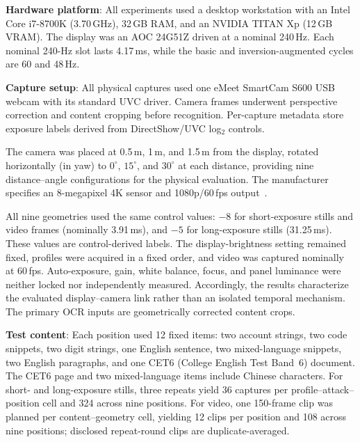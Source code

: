 \documentclass{ieeeaccess}
\begin{document}
\textbf{Hardware platform}: All experiments used a desktop workstation with an Intel Core i7-8700K (3.70\,GHz), 32\,GB RAM, and an NVIDIA TITAN Xp (12\,GB VRAM). The display was an AOC 24G51Z driven at a nominal 240\,Hz. Each nominal 240-Hz slot lasts 4.17\,ms, while the basic and inversion-augmented cycles are 60 and 48\,Hz.

\textbf{Capture setup}: All physical captures used one eMeet SmartCam S600 USB webcam with its standard UVC driver. Camera frames underwent perspective correction and content cropping before recognition. Per-capture metadata store exposure labels derived from DirectShow/UVC log$_2$ controls.

The camera was placed at 0.5\,m, 1\,m, and 1.5\,m from the display, rotated horizontally (in yaw) to $0^{\circ}$, $15^{\circ}$, and $30^{\circ}$ at each distance, providing nine distance--angle configurations for the physical evaluation. The manufacturer specifies an 8-megapixel 4K sensor and 1080p/60\,fps output~\cite{b_emeet_s600}.

All nine geometries used the same control values: $-8$ for short-exposure stills and video frames (nominally 3.91\,ms), and $-5$ for long-exposure stills (31.25\,ms). These values are control-derived labels. The display-brightness setting remained fixed, profiles were acquired in a fixed order, and video was captured nominally at 60\,fps. Auto-exposure, gain, white balance, focus, and panel luminance were neither locked nor independently measured. Accordingly, the results characterize the evaluated display--camera link rather than an isolated temporal mechanism. The primary OCR inputs are geometrically corrected content crops.



\textbf{Test content}: Each position used 12 fixed items: two account strings, two code snippets, two digit strings, one English sentence, two mixed-language snippets, two English paragraphs, and one CET6 (College English Test Band~6) document. The CET6 page and two mixed-language items include Chinese characters. For short- and long-exposure stills, three repeats yield 36 captures per profile--attack--position cell and 324 across nine positions. For video, one 150-frame clip was planned per content--geometry cell, yielding 12 clips per position and 108 across nine positions; disclosed repeat-round clips are duplicate-averaged. 
\end{document}
